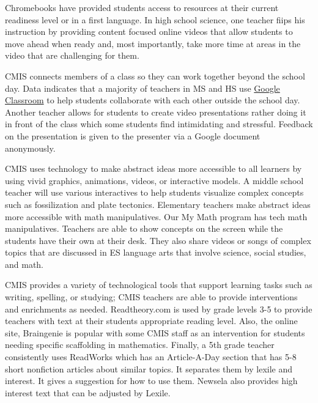 \documentclass{report}
\begin{document}
\begin{findings}

Chromebooks have provided students access to resources at their current readiness level or in a first language. In high school science, one teacher fiips his instruction by providing content focused online videos that allow students to move ahead when ready and, most importantly, take more time at areas in the video that are challenging for them.  

CMIS connects members of a class so they can work together beyond the school day. Data indicates that a majority of teachers in MS and HS use \href{https://classroom.google.com/u/0/h}{Google Classroom} to help students collaborate with each other outside the school day. Another teacher allows for students to create video presentations rather doing it in front of the class  which some students find intimidating and stressful. Feedback on the presentation is given to the presenter via a Google document anonymously.  

CMIS uses technology to make abstract ideas more accessible to all learners by using vivid graphics, animations, videos, or interactive models. A middle school teacher will use various interactives to help students visualize complex concepts such as fossilization and plate tectonics. Elementary teachers make abstract ideas more accessible with math manipulatives. Our My Math program has tech math manipulatives. Teachers are able to show concepts on the screen while the students  have their own at their desk. They also share videos or songs of complex topics that are discussed in ES language arts that involve science, social studies, and math. 

CMIS provides a variety of technological  tools that support learning tasks such as writing, spelling, or studying; CMIS teachers are able to provide interventions and enrichments as needed. Readtheory.com is used by grade levels 3-5 to provide teachers with text at their students appropriate reading level. Also, the online site, Braingenie is popular with some CMIS staff as an intervention for students needing specific scaffolding in mathematics. Finally, a 5th grade teacher consistently uses ReadWorks which has an Article-A-Day section that has 5-8 short nonfiction articles about similar topics. It separates them by lexile and interest. It gives a suggestion for how to use them. Newsela also provides high interest text that can be adjusted by Lexile. 

 

\end{findings}
\end{document}
